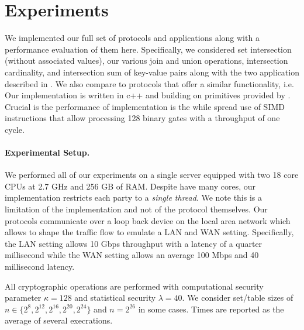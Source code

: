 

\section{Experiments}\label{sec:eval}


We implemented our full set of protocols and applications along with a performance evaluation of them here. Specifically, we considered set intersection (without associated values), our various join and union operations, intersection cardinality, and intersection sum of key-value pairs along with the two application described in . We also compare to protocols that offer a similar functionality, i.e. \cite{CCS:KKRT16, PSWW18,ASIACCS:BlaAgu12,DBLP:conf/cans/CristofaroGT12,cryptoeprint:2017:738} Our implementation is written in c++ and building on primitives provided by \cite{libOTe}. Crucial is the performance of implementation is the while spread use of SIMD instructions that allow processing 128 binary gates with a throughput of one cycle.



\paragraph{Experimental Setup.} We performed all of our experiments on a single server equipped with two 18 core CPUs at 2.7 GHz and 256 GB of RAM. Despite have many cores, our implementation restricts each party to a \emph{single thread}. We note this is a limitation of the implementation and not of the protocol themselves. Our protocols communicate over a loop back device on the local area network which allows to shape the traffic flow to emulate a LAN and WAN setting. Specifically, the LAN setting allows 10 Gbps throughput with a latency of a quarter millisecond while the WAN setting allows an average 100 Mbps and 40 millisecond latency.

All cryptographic operations are performed with computational security parameter $\kappa=128$ and statistical security $\lambda=40$. We consider set/table sizes of $n\in\{2^8, 2^{12}, 2^{16}, 2^{20}, 2^{24}\}$ and $n=2^{26}$ in some cases. Times are reported as the average of several execrations.

